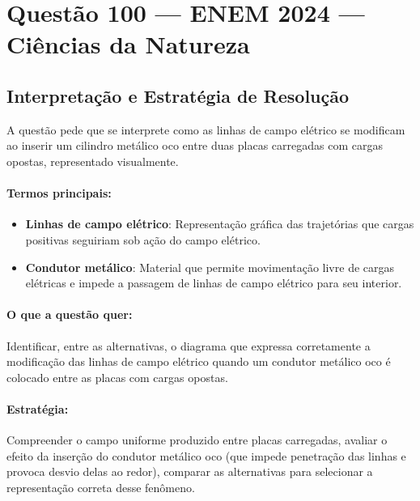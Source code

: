 \documentclass{article}
\begin{document}
\section*{Questão 100 — ENEM 2024 — Ciências da Natureza}

\subsection*{Interpretação e Estratégia de Resolução}
A questão pede que se interprete como as linhas de campo elétrico se modificam ao inserir um cilindro metálico oco entre duas placas carregadas com cargas opostas, representado visualmente.

\paragraph{Termos principais:}
\begin{itemize}
  \item \textbf{Linhas de campo elétrico}: Representação gráfica das trajetórias que cargas positivas seguiriam sob ação do campo elétrico.
  \item \textbf{Condutor metálico}: Material que permite movimentação livre de cargas elétricas e impede a passagem de linhas de campo elétrico para seu interior.
\end{itemize}

\paragraph{O que a questão quer:}
Identificar, entre as alternativas, o diagrama que expressa corretamente a modificação das linhas de campo elétrico quando um condutor metálico oco é colocado entre as placas com cargas opostas.

\paragraph{Estratégia:}
Compreender o campo uniforme produzido entre placas carregadas, avaliar o efeito da inserção do condutor metálico oco (que impede penetração das linhas e provoca desvio delas ao redor), comparar as alternativas para selecionar a representação correta desse fenômeno.
\end{document}
